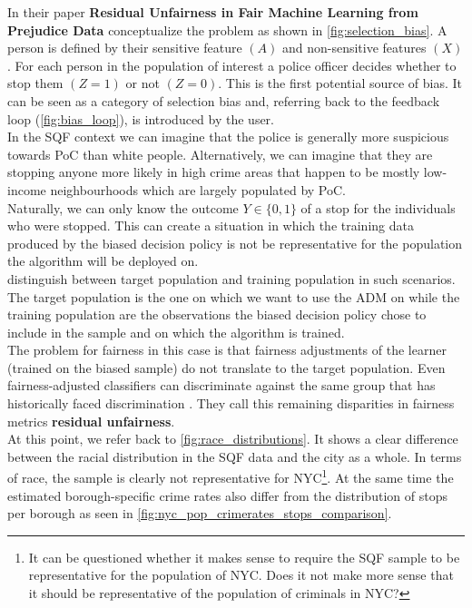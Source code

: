 In their paper \textbf{Residual Unfairness in Fair Machine Learning from Prejudice Data} \cite{kallus2018} conceptualize the problem as shown in \autoref{fig:selection_bias}.
A person is defined by their sensitive feature $(A)$ and non-sensitive features $(X)$. For each person in the population of interest a police officer decides whether to stop them $(Z = 1)$ or not $(Z = 0)$. This is the first potential source of bias. It can be seen as a category of selection bias and, referring back to the feedback loop (\autoref{fig:bias_loop}), is introduced by the user.\\
In the SQF context we can imagine that the police is generally more suspicious towards PoC than white people. Alternatively, we can imagine that they are stopping anyone more likely in high crime areas that happen to be mostly low-income neighbourhoods which are largely populated by PoC. \\
Naturally, we can only know the outcome $Y \in \{0, 1\}$ of a stop for the individuals who were stopped. This can create a situation in which the training data produced by the biased decision policy is not be representative for the population the algorithm will be deployed on.\\
\cite{kallus2018} distinguish between target population and training population in such scenarios. The target population is the one on which we want to use the ADM on while the training population are the observations the biased decision policy chose to include in the sample and on which the algorithm is trained.\\
The problem for fairness in this case is that fairness adjustments of the learner (trained on the biased sample) do not translate to the target population. Even fairness-adjusted classifiers can discriminate against the same group that has historically faced discrimination \cite{kallus2018}. They call this remaining disparities in fairness metrics \textbf{residual unfairness}.\\
At this point, we refer back to \autoref{fig:race_distributions}. It shows a clear difference between the racial distribution in the SQF data and the city as a whole. In terms of race, the sample is clearly not representative for NYC\footnote{It can be questioned whether it makes sense to require the SQF sample to be representative for the population of NYC. Does it not make more sense that it should be representative of the population of criminals in NYC?}. At the same time the estimated borough-specific crime rates also differ from the distribution of stops per borough as seen in \autoref{fig:nyc_pop_crimerates_stops_comparison}. \\
